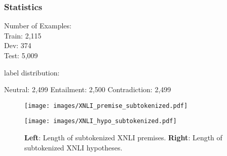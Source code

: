 \subsubsection{Statistics}

Number of Examples: \\
Train: 2,115 \\
Dev: 374 \\
Test: 5,009










label distribution:

Neutral: 2,499
Entailment: 2,500
Contradiction: 2,499

\begin{figure}
  \begin{minipage}{0.45\linewidth}
  \vspace{0pt}
    \texttt{[image: images/XNLI\_premise\_subtokenized.pdf]}
  \end{minipage}
  \hfill
  \begin{minipage}{0.45\linewidth}
  \vspace{0pt}
    \texttt{[image: images/XNLI\_hypo\_subtokenized.pdf]}
  \end{minipage}
  \caption[XNLI Lengths]{\textbf{Left}: Length of subtokenized XNLI premises. \textbf{Right}: Length of subtokenized XNLI hypotheses.}
\end{figure}


